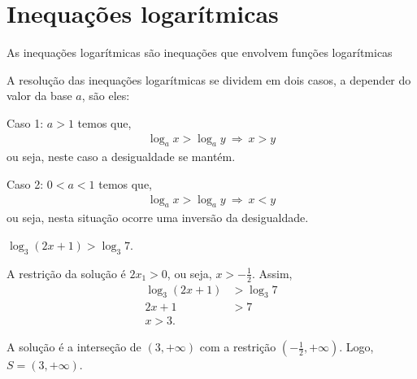   \section{Inequações logarítmicas}
 
\begin{obs}
 As inequações logarítmicas são inequações que envolvem funções logarítmicas
\end{obs}
 
 A resolução das inequações logarítmicas se dividem em dois casos, a depender do valor da base $a$, são eles:
 
 Caso 1: $a > 1$ temos que,
  \begin{eqnarray*}
 \log_a x > \log_a y \ \Rightarrow \ x>y
 \end{eqnarray*}
 ou seja, neste caso a desigualdade se mantém.

 Caso 2: $0< a < 1$ temos que,
  \begin{eqnarray*}
 \log_a x > \log_a y \ \Rightarrow \ x<y
 \end{eqnarray*}
 ou seja, nesta situação ocorre uma inversão da desigualdade.
 
  \begin{exem}
  $\log_3(2x+1)>\log_3 7$.

  A restrição da solução é $2x_1>0$, ou seja, $x>-\frac{1}{2}$. Assim,
  \begin{align*}
      \log_3(2x+1) &>\log_3 7\\
      2x+1&>7\\
      x>3.
  \end{align*}

  A solução é a interseção de $(3,+\infty)$ com a restrição $(-\frac{1}{2},+\infty)$. Logo, $S=(3,+\infty)$.
  \end{exem}


